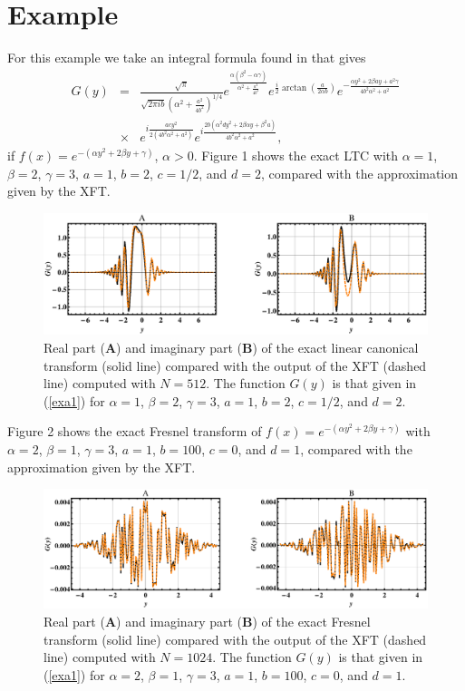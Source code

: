 \documentclass[12pt]{article}
\begin{document}
\section{Example}
For this example we take an integral formula found in \cite{Gra94} that gives
\begin{eqnarray}\label{exa1}
G(y)&=&\frac{\sqrt{\pi}}{\sqrt{2\pi ib}(\alpha^2+\frac{a^2}{4 b^2})^{1/4}} e^{\frac{\alpha(\beta^2-\alpha\gamma)}{\alpha^2+\frac{a^2}{4 b^2}}}
e^{\frac{i}{2} \arctan(\frac{a}{2\alpha b})} e^{-\frac{\alpha y^2+2 \beta a y+a^2\gamma}{4 b^2\alpha^2+a^2}} \\
&\times& e^{i\frac{a c y^2}{2(4 b^2 \alpha^2+a^2)}} e^{i\frac{2 b (\alpha^2 d y^2+2 \beta\alpha y+\beta^2 a)}{4 b^2 \alpha^2+a^2}},\nonumber
\end{eqnarray}
if $f(x)=e^{-(\alpha y^2+2 \beta y+\gamma)}$, $\alpha>0$.
Figure 1 shows the exact LTC with $\alpha=1$, $\beta=2$, $\gamma=3$, $a=1$, $b=2$, $c=1/2$, and $d=2$, compared with the approximation given by the XFT.
\begin{figure}\label{Figu}
\centering
\includegraphics[scale=0.6]{fig1s.eps}
\caption{Real part ({\bf A}) and imaginary part ({\bf B}) of the exact linear canonical transform (solid line) compared with the output of the XFT (dashed line) computed with $N=512$. The function $G(y)$ is that given in (\ref{exa1}) for $\alpha=1$, $\beta=2$, $\gamma=3$, $a=1$, $b=2$, $c=1/2$, and $d=2$.}
\end{figure}
Figure 2 shows the exact Fresnel transform of $f(x)=e^{-(\alpha y^2+2\beta  y+\gamma)}$ with $\alpha=2$, $\beta=1$, $\gamma=3$, $a=1$, $b=100$, $c=0$, and $d=1$, compared with the approximation given by the XFT.
\begin{figure}\label{Figd}
\centering
\includegraphics[scale=0.55]{fig2s.eps}
\caption{Real part ({\bf A}) and imaginary part ({\bf B}) of the exact Fresnel transform (solid line) compared with the output of the XFT (dashed line) computed with $N=1024$. The function $G(y)$ is that given in (\ref{exa1}) for $\alpha=2$, $\beta=1$, $\gamma=3$, $a=1$, $b=100$, $c=0$, and $d=1$.}
\end{figure}
\end{document}
